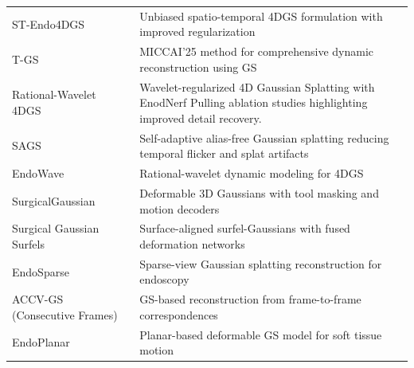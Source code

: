 \documentclass[11pt]{article}
\begin{document}
\begin{table}[htbp]
{\begin{tabular}{l p{10.6cm}}
ST-Endo4DGS~ & Unbiased spatio-temporal 4DGS formulation with improved regularization\\%

T-GS~ & MICCAI’25 method for comprehensive dynamic reconstruction using GS\\%

Rational-Wavelet 4DGS~ & Wavelet-regularized 4D Gaussian Splatting with EnodNerf Pulling ablation studies highlighting improved detail recovery. \\

SAGS~ & Self-adaptive alias-free Gaussian splatting reducing temporal flicker and splat artifacts\\%

EndoWave~ & Rational-wavelet dynamic modeling for 4DGS \\%

SurgicalGaussian~ & Deformable 3D Gaussians with tool masking and motion decoders\\%

Surgical Gaussian Surfels~ & Surface-aligned surfel-Gaussians with fused deformation networks\\%

EndoSparse~ & Sparse-view Gaussian splatting reconstruction for endoscopy\\%

ACCV-GS (Consecutive Frames)~ & GS-based reconstruction from frame-to-frame correspondences\\%

EndoPlanar~ & Planar-based deformable GS model for soft tissue motion\\%
\hline
\end{tabular}
}
\end{table}
\end{document}
